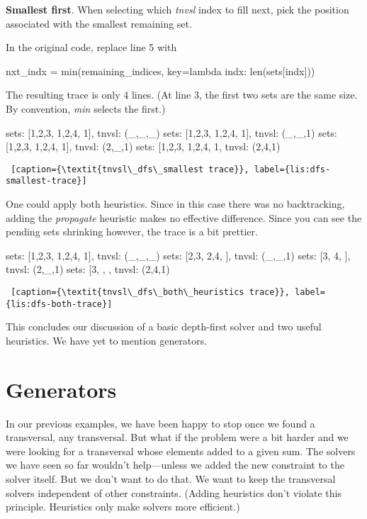 \noindent\textbf{Smallest first}. When selecting which \textit{tnvsl} index to fill next, pick the position associated with the smallest remaining set. 

In the original code, replace line 5 with 
\begin{python1}
 nxt_indx = min(remaining_indices,
                key=lambda indx: len(sets[indx]))
\end{python1}

The resulting trace is only 4 lines. (At line 3, the first two sets are the same size. By convention, \textit{min} selects the first.)

\begin{minipage}[c]{0.45\textwidth}
\begin{python1}[numbers=left]
sets: [{1,2,3}, {1,2,4}, {1}], tnvsl: (_,_,_)
  sets: [{1,2,3}, {1,2,4}, {1}], tnvsl: (_,_,1)
    sets: [{1,2,3}, {1,2,4}, {1}], tnvsl: (2,_,1)
      sets: [{1,2,3}, {1,2,4}, {1}, tnvsl: (2,4,1)
\end{python1}
\begin{lstlisting} [caption={\textit{tnvsl\_dfs\_smallest trace}}, label={lis:dfs-smallest-trace}]
\end{lstlisting}
\end{minipage}

One could apply both heuristics. Since in this case there was no backtracking, adding the \textit{propagate} heuristic makes no effective difference. Since you can see the pending sets shrinking however, the trace is a bit prettier.

\begin{minipage}[c]{0.45\textwidth}
\begin{python1}[numbers=left]
sets: [{1,2,3}, {1,2,4}, {1}], tnvsl: (_,_,_)
  sets: [{2,3}, {2,4}, {}], tnvsl: (_,_,1)
    sets: [{3}, {4}, {}], tnvsl: (2,_,1)
      sets: [{3}, {}, {}, tnvsl: (2,4,1)
\end{python1}
\begin{lstlisting} [caption={\textit{tnvsl\_dfs\_both\_heuristics trace}}, label={lis:dfs-both-trace}]
\end{lstlisting}
\end{minipage}

This concludes our discussion of a basic depth-first solver and two useful heuristics. We have yet to mention generators.

\section{Generators} \label{sec:generators}
In our previous examples, we have been happy to stop once we found a transversal,  any transversal. But what if the problem were a bit harder and we were looking for a transversal whose elements added to a given sum. The solvers we have seen so far wouldn't help---unless we added the new constraint to the solver itself. But we don't want to do that. We want to keep the transversal solvers independent of other constraints. (Adding heuristics don't violate this principle. Heuristics only make solvers more efficient.)


